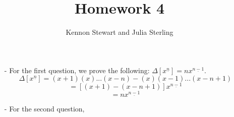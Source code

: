 \documentclass{report}
\title{Homework 4}
\author{Kennon Stewart and Julia Sterling}
\begin{document}
\maketitle

  \begin{itemize}
    \item[-] For the first question, we prove the following: $\Delta[x^{\underline n}]=nx^{\underline{n-1}}$.
    $$\Delta[x^{\underline n}]=(x+1)(x)...(x-n)-(x)(x-1)...(x-n+1)$$
    $$=[(x+1)-(x-n+1)]x^{\underline{n-1}}$$
    $$=nx^{\underline{n-1}}$$
    \item[-] For the second question, 
  \end{itemize}
\end{document}
